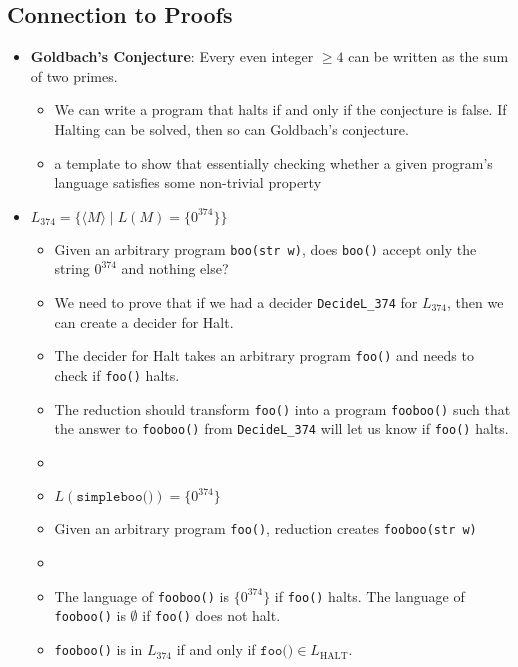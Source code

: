 \subsection{Connection to Proofs}
\begin{itemize}
    \item \textbf{Goldbach's Conjecture}: Every even integer $\geq 4$ can be written as the sum of two primes.
    \begin{itemize}
        \item We can write a program that halts if and only if the conjecture is false. If Halting can be solved, then so can Goldbach's conjecture.
    \end{itemize}
    \begin{itemize}
        \item a template to show that essentially checking whether a given program's language satisfies some non-trivial property
    \end{itemize}
    \item $L_{374} = \{ \langle M \rangle \mid L(M) = \{ 0^{374} \} \}$
    \begin{itemize}
        \item Given an arbitrary program \texttt{boo(str w)}, does \texttt{boo()} accept only the string $0^{374}$ and nothing else?
        \item We need to prove that if we had a decider \texttt{DecideL\_374} for $L_{374}$, then we can create a decider for Halt.
        \item The decider for Halt takes an arbitrary program \texttt{foo()} and needs to check if \texttt{foo()} halts.
        \item The reduction should transform \texttt{foo()} into a program \texttt{fooboo()} such that the answer to \texttt{fooboo()} from \texttt{DecideL\_374} will let us know if \texttt{foo()} halts.
        \item[] 
        \item $L(\texttt{simpleboo()}) = \{ 0^{374} \}$
        \item Given an arbitrary program \texttt{foo()}, reduction creates \texttt{fooboo(str w)}
        \item[] 
        \item The language of \texttt{fooboo()} is $\{ 0^{374} \}$ if \texttt{foo()} halts. The language of \texttt{fooboo()} is $\emptyset$ if \texttt{foo()} does not halt.
        \item \texttt{fooboo()} is in $L_{374}$ if and only if $\texttt{foo()} \in L_{\text{HALT}}$.

\end{itemize}
\end{itemize}

